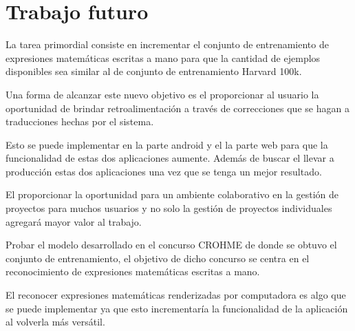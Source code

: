 \chapter{Trabajo futuro}

La tarea primordial consiste en incrementar el conjunto de entrenamiento de expresiones matemáticas escritas a mano para que la cantidad de ejemplos disponibles sea similar al de conjunto de entrenamiento Harvard 100k.

Una forma de alcanzar este nuevo objetivo es el proporcionar al usuario la oportunidad de brindar retroalimentación a través de correcciones que se hagan a traducciones hechas por el sistema.

Esto se puede implementar en la parte android y el la parte web para que la funcionalidad de estas dos aplicaciones aumente. Además de buscar el llevar a producción estas dos aplicaciones una vez que se tenga un mejor resultado.

El proporcionar la oportunidad para un ambiente colaborativo en la gestión de proyectos para muchos usuarios y no solo la gestión de proyectos individuales agregará mayor valor al trabajo.

Probar el modelo desarrollado en el concurso CROHME de donde se obtuvo el conjunto de entrenamiento, el objetivo de dicho concurso se centra en el reconocimiento de expresiones matemáticas escritas a mano.

El reconocer expresiones matemáticas renderizadas por computadora es algo que se puede implementar ya que esto incrementaría la funcionalidad de la aplicación al volverla más versátil.
